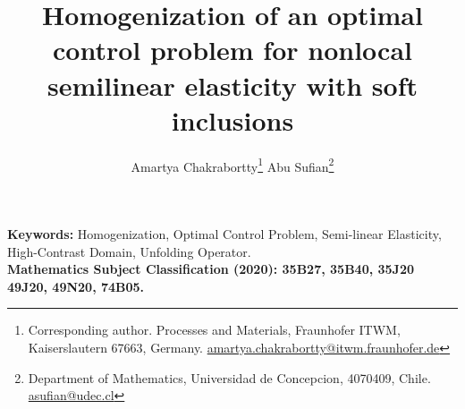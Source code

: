 \documentclass[11pt,a4paper]{article}
\numberwithin{equation}{section}
\begin{document}
	
	\title{Homogenization of an optimal control problem for nonlocal semilinear elasticity with soft inclusions}
	
	
\author{%
	Amartya Chakrabortty\thanks{Corresponding author. Processes and Materials, Fraunhofer ITWM, Kaiserslautern 67663, Germany. \href{mailto:amartya.chakrabortty@itwm.fraunhofer.de}{amartya.chakrabortty@itwm.fraunhofer.de}}\hskip 10mm
	Abu Sufian\thanks{Department of Mathematics, Universidad de Concepcion, 4070409, Chile. \href{mailto:asufian@udec.cl}{asufian@udec.cl}}
}



	\date{}
	
	\maketitle
	{\bf Keywords:}
	Homogenization, Optimal Control Problem, Semi-linear Elasticity, High-Contrast Domain, Unfolding Operator.\\
	
	{\bf { Mathematics Subject Classification (2020):} 35B27, 35B40, 35J20 49J20, 49N20, 74B05.}
	
	
	
\end{document}
